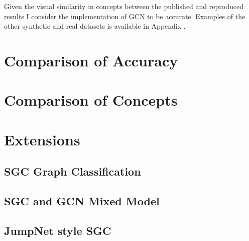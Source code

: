 Given the visual similarity in concepts between the published and reproduced results I consider the implementation of GCN to be accurate.
Examples of the other synthetic and real datasets is available in Appendix .

\section{Comparison of Accuracy}
\label{sec:comp-acc}


\section{Comparison of Concepts}
\label{sec:comp-concept}


\section{Extensions}

\subsection{SGC Graph Classification}

\subsection{SGC and GCN Mixed Model}

\subsection{JumpNet style SGC}

